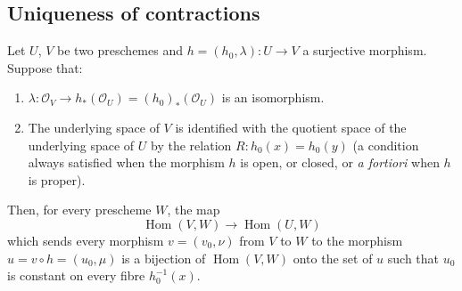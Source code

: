 \subsection{Uniqueness of contractions}
\label{subsection:II.8.11}

\begin{lemma}[8.11.1]
\label{II.8.11.1}
Let $U$, $V$ be two preschemes and
$h=(h_0,\lambda):U\to V$ a surjective morphism. Suppose that:
\begin{enumerate}
  \item[$1^\circ$]
  $\lambda:\mathcal{O}_V\to h_*(\mathcal{O}_U)
  =(h_0)_*(\mathcal{O}_U)$ is an isomorphism.
  \item[$2^\circ$] The underlying space of $V$ is identified with the
  quotient space of the underlying space of $U$ by the relation
  $R:h_0(x)=h_0(y)$ (a condition always satisfied when the morphism $h$ is
  open, or closed, or \emph{a fortiori} when $h$ is proper).
\end{enumerate}
Then, for every prescheme $W$, the map
\begin{equation}
\label{II.8.11.1.1}
  \operatorname{Hom}(V,W)\longrightarrow\operatorname{Hom}(U,W)
\tag{8.11.1.1}
\end{equation}
which sends every morphism $v=(v_0,\nu)$ from $V$ to $W$ to the
morphism $u=v\circ h=(u_0,\mu)$ is a bijection of
$\operatorname{Hom}(V,W)$ onto the set of $u$ such that $u_0$ is
constant on every fibre $h_0^{-1}(x)$.
\end{lemma}

